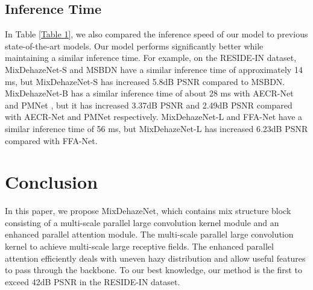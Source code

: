 \documentclass[10pt,twocolumn,letterpaper]{article}
\begin{document}
\begin{table}[t b p]
\renewcommand\arraystretch{1.5}
\centering
\caption{\centering Enhanced Parallel Attention ablation study on the RESIDE-IN dataset.}
\label{Table 6}
\end{table}

\subsection{Inference Time}
In Table \ref{Table 1}, we also compared the inference speed of our model to previous state-of-the-art models. Our model performs significantly better while maintaining a similar inference time. For example, on the RESIDE-IN dataset, MixDehazeNet-S and MSBDN \cite{MSBDN} have a similar inference time of approximately 14 ms, but MixDehazeNet-S has increased 5.8dB PSNR compared to MSBDN. MixDehazeNet-B has a similar inference time of about 28 ms with AECR-Net \cite{AECR-net} and PMNet \cite{PMNet}, but it has increased 3.37dB PSNR and 2.49dB PSNR compared with AECR-Net and PMNet respectively.  MixDehazeNet-L and FFA-Net \cite{qin2020ffa} have a similar inference time of 56 ms, but MixDehazeNet-L has increased 6.23dB PSNR compared with FFA-Net.
\section{Conclusion}
In this paper, we propose MixDehazeNet, which contains mix structure block consisting of a multi-scale parallel large convolution kernel module and an enhanced parallel attention module. The multi-scale parallel large convolution kernel to achieve multi-scale large receptive fields. The enhanced parallel attention efficiently deals with uneven hazy distribution and allow useful features to pass through the backbone. To our best knowledge, our method is the first to exceed 42dB PSNR in the RESIDE-IN dataset.
\end{document}
